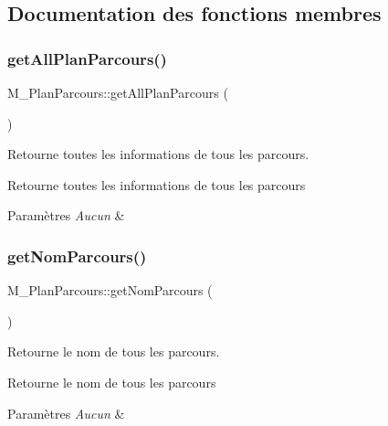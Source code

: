 \subsection{Documentation des fonctions membres}
\mbox{\label{class_m___plan_parcours_a7224bcf89c4ef0aec9d62f58c4ab558e}} 
\subsubsection{\texorpdfstring{get\+All\+Plan\+Parcours()}{getAllPlanParcours()}}
{\footnotesize\ttfamily M\+\_\+\+Plan\+Parcours\+::get\+All\+Plan\+Parcours (\begin{DoxyParamCaption}{ }\end{DoxyParamCaption})}



Retourne toutes les informations de tous les parcours. 

Retourne toutes les informations de tous les parcours 
\begin{DoxyParams}{Paramètres}
{\em Aucun} & \\
\hline
\end{DoxyParams}
\mbox{\label{class_m___plan_parcours_a7ebc02c441c37fef209de922c3125fc4}} 
\subsubsection{\texorpdfstring{get\+Nom\+Parcours()}{getNomParcours()}}
{\footnotesize\ttfamily M\+\_\+\+Plan\+Parcours\+::get\+Nom\+Parcours (\begin{DoxyParamCaption}{ }\end{DoxyParamCaption})}



Retourne le nom de tous les parcours. 

Retourne le nom de tous les parcours 
\begin{DoxyParams}{Paramètres}
{\em Aucun} & \\
\hline
\end{DoxyParams}
\mbox{\label{class_m___plan_parcours_ad1d2afe3aa6cf2a7658f37de1277ed87}} 
